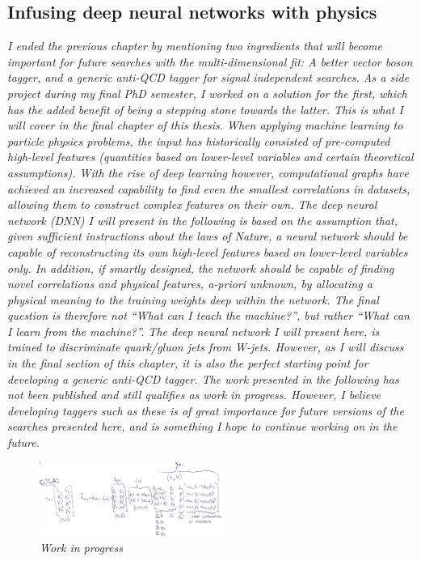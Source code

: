 \vspace*{\fill}
\begin{centering}
\section{Infusing deep neural networks with physics}
\label{sec:lolaintro}
\textit{
I ended the previous chapter by mentioning two ingredients that will become important for future searches with the multi-dimensional fit: A better vector boson tagger, and a generic anti-QCD tagger for signal independent searches. As a side project during my final PhD semester, I worked on a solution for the first, which has the added benefit of being a stepping stone towards the latter. This is what I will cover in the final chapter of this thesis.
\newline
\newline
When applying machine learning to particle physics problems, the input has historically consisted of pre-computed high-level features (quantities based on lower-level variables and certain theoretical assumptions).
With the rise of deep learning however, computational graphs have achieved an increased capability to find even the smallest correlations in datasets, allowing them to construct complex features on their own. The deep neural network (DNN) I will present in the following is based on the assumption that, given sufficient instructions about the laws of Nature, a neural network should be capable of reconstructing its own high-level features based on lower-level variables only. In addition, if smartly designed, the network should be capable of finding novel correlations and physical features, a-priori unknown, by allocating a physical meaning to the training weights deep within the network. The final question is therefore not ``What can I teach the machine?'', but rather ``What can I learn from the machine?''. The deep neural network I will present here, is trained to discriminate quark/gluon jets from W-jets. However, as I will discuss in the final section of this chapter, it is also the perfect starting point for developing a generic anti-QCD tagger.
\newline
\newline
The work presented in the following has not been published and still qualifies as work in progress. However, I believe developing taggers such as these is of great importance for future versions of the searches presented here, and is something I hope to continue working on in the future.
}
\begin{figure}[b!] 
    \centering
    \includegraphics[width=6cm]{figures/vtagging/misc/cola.png}
    \vspace*{10mm}
    \caption*{\footnotesize{\textit{Work in progress}}}
\end{figure}
\end{centering}
\clearpage
\vspace*{\fill}

